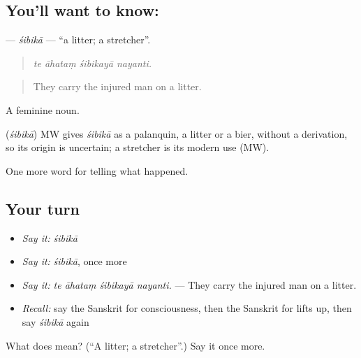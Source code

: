 \subsection*{You'll want to know: }
\textbf{} — \emph{śibikā} — \textquotedblleft{}a litter; a stretcher\textquotedblright{}.

\begin{quote}
   
\end{quote}

\begin{quote}
\emph{te āhataṃ śibikayā nayanti.}
\end{quote}

\begin{quote}
They carry the injured man on a litter.
\end{quote}

A feminine noun.

\begin{cousinweb}
\textbf{} (\emph{śibikā}) MW gives \emph{śibikā} as a palanquin, a litter or a bier, without a derivation, so its origin is uncertain; a stretcher is its modern use (MW).
\end{cousinweb}

\begin{grammarlens}[title={What you've built}]
One more word for telling what happened.
\end{grammarlens}

\subsection*{Your turn}
\begin{itemize}
\raggedright
  \item \emph{Say it:} \emph{śibikā}
  \item \emph{Say it:} \emph{śibikā}, once more
  \item \emph{Say it:} \emph{te āhataṃ śibikayā nayanti.} — They carry the injured man on a litter.
  \item \emph{Recall:} say the Sanskrit for consciousness, then the Sanskrit for lifts up, then say \emph{śibikā} again
\end{itemize}

\begin{tcolorbox}[breakable,colback=teal!4,colframe=teal!35!black,title={Before you move on}]
What does  mean? (\textquotedblleft{}A litter; a stretcher\textquotedblright{}.) Say it once more.
\end{tcolorbox}
